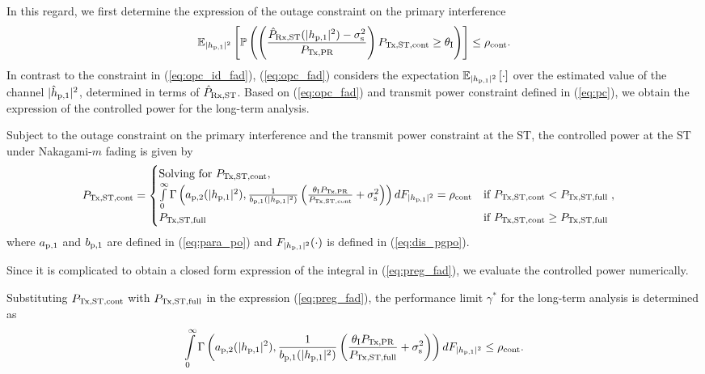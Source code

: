 In this regard, we first determine the expression of the outage constraint on the primary interference  
\begin{align}
{\mathbb E}_{|h_{\text{p,1}}|^2}\left[ \mathbb P\left( \left( \frac{\hat{P}_{\text{Rx,ST}}(|h_{\text{p,1}}|^2) - \sigma^2_{\text{s}}}{P_{\text{Tx,PR}}}\right) P_{\text{Tx,ST,cont}} \ge \theta_{\text{I}} \right) \right] \le \rho_{\text{cont}}. \label{eq:opc_fad} 
\end{align}
In contrast to the constraint in (\ref{eq:opc_id_fad}), (\ref{eq:opc_fad}) considers the expectation ${\mathbb E}_{|h_{\text{p,1}}|^2}\left[ \cdot \right]$ over the estimated value of the channel $|\hat{h}_{\text{p,1}}|^2$, determined in terms of $\hat{P}_{\text{Rx,ST}}$. 
Based on (\ref{eq:opc_fad}) and transmit power constraint defined in (\ref{eq:pc}), we obtain the expression of the controlled power for the long-term analysis.

\begin{lemma} \label{lm:lm6}
\normalfont
Subject to the outage constraint on the primary interference and the transmit power constraint at the ST, the controlled power at the ST under Nakagami-$m$ fading is given by
\begin{align}
P_{\text{Tx,ST,cont}} &= 
\begin{cases} 
\text{Solving for $P_{\text{Tx,ST,cont}}$, } \\ \int\limits_{0}^{\infty} \Gamma\left(a_{\text{p,2}}(|h_{\text{p,1}}|^2), \frac{1}{b_{\text{p,1}}(|h_{\text{p,1}}|^2)} \left(\frac{\theta_{\text{I}}P_{\text{Tx,PR}}}{P_{\text{Tx,ST,cont}}} + \sigma^2_{\text{s}} \right)\right) d F_{|h_{\text{p,1}}|^2} = \rho_{\text{cont}} & \mbox{if } P_{\text{Tx,ST,cont}} < P_{\text{Tx,ST,full}} \\
P_{\text{Tx,ST,full}} & \mbox{if } P_{\text{Tx,ST,cont}} \ge P_{\text{Tx,ST,full}}
\end{cases},
\label{eq:preg_fad} 
\end{align}
where $a_{\text{p,1}}$ and $b_{\text{p,1}}$ are defined in (\ref{eq:para_po}) and $F_{|h_{\text{p,1}}|^2}(\cdot)$ is defined in (\ref{eq:dis_pgpo}). 
\end{lemma} 
\begin{IEEEproof}
Since it is complicated to obtain a closed form expression of the integral in (\ref{eq:preg_fad}), we evaluate the controlled power numerically.  
\end{IEEEproof}

Substituting $P_{\text{Tx,ST,cont}}$ with $P_{\text{Tx,ST,full}}$ in the expression (\ref{eq:preg_fad}), the performance limit $\gamma^*$ for the long-term analysis is determined as
\begin{equation}
\int\limits_{0}^{\infty} \Gamma\left(a_{\text{p,2}}(|h_{\text{p,1}}|^2), \frac{1}{b_{\text{p,1}}(|h_{\text{p,1}}|^2)} \left(\frac{\theta_{\text{I}}P_{\text{Tx,PR}}}{P_{\text{Tx,ST,full}}} + \sigma^2_{\text{s}} \right)\right) d F_{|h_{\text{p,1}}|^2} \le \rho_{\text{cont}}. \label{eq:or_fad}
\end{equation}

